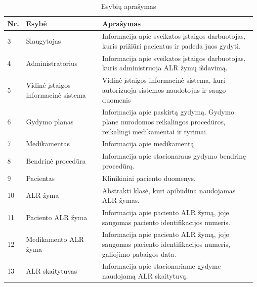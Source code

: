 \begin{table}[ht!]
    \centering
    \renewcommand{\arraystretch}{1.2}
    \renewcommand\thetable{7}

    \begin{tabular}{|m{3em}|m{12em}|m{22em}|}
    \hline 
    \rowcolor[HTML]{EFEFEF} 
    Nr. & Esybė & Aprašymas \\ \hline

    3  &  Slaugytojas  & Informacija apie sveikatos įstaigos darbuotojas, kuris prižiūri pacientus ir padeda juos gydyti.    \\ \hline
    4  &  Administratorius  & Informacija apie sveikatos įstaigos darbuotojas, kuris administruoja ALR žymų išdavimą.       \\ \hline
    5  &  Vidinė įstaigos informacinė sistema  & Vidinė įstaigos informacinė sistema, kuri autorizuoja sistemos naudotojus ir saugo duomenis \\ \hline
    6  &  Gydymo planas  & Informacija apie paskirtą gydymą. Gydymo plane nurodomos reikalingos procedūros, reikalingi medikamentai ir tyrimai.       \\ \hline
    7  &  Medikamentas  & Informacija apie medikamentą.       \\ \hline
    8  &  Bendrinė procedūra  & Informacija apie stacionaraus gydymo bendrinę procedūrą.       \\ \hline
    9  &  Pacientas  & Klinikiniai paciento duomenys.       \\ \hline
    10  &  ALR žyma  & Abstrakti klasė, kuri apibūdina naudojamas ALR žymas.    \\ \hline
    11  &  Paciento ALR žyma  & Informacija apie paciento ALR žymą, joje saugomas paciento identifikacijos numeris.    \\ \hline
    12  &  Medikamento ALR žyma  & Informacija apie paciento ALR žymą, joje saugomas paciento identifikacijos numeris, galiojimo pabaigos data.    \\ \hline
    13  &  ALR skaitytuvas  & Informacija apie stacionariame gydyme naudojamą ALR skaitytuvą. \\ \hline


    \end{tabular}
    \caption{Esybių aprašymas} 

\end{table}

